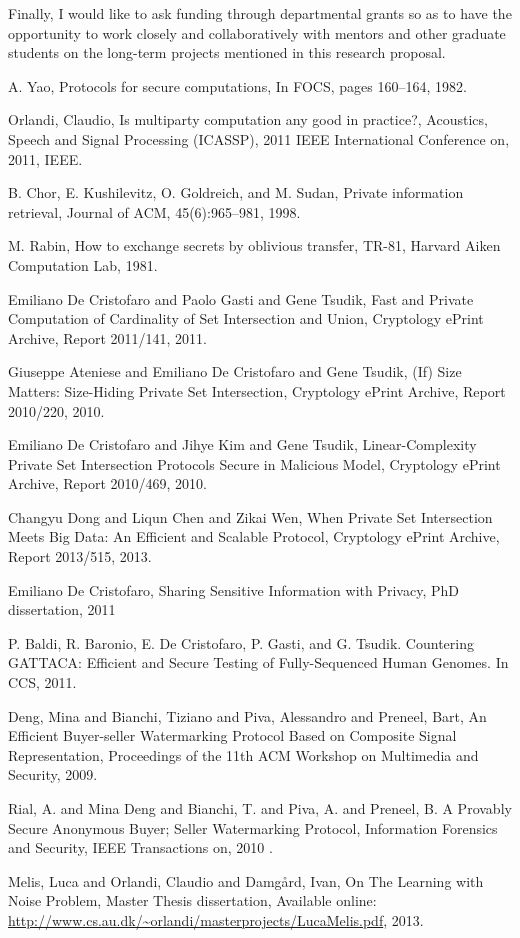 \documentclass[dvips,12pt]{article}
\begin{document}
Finally, I would like to ask funding through departmental grants so as to have the opportunity to work closely and collaboratively with mentors and other graduate students on the long-term projects mentioned in this research proposal.
\begin{thebibliography}{99}

	A. Yao,
	Protocols for secure computations,	
	In FOCS, pages 160–164, 1982.

	Orlandi, Claudio,  	
  	Is multiparty computation any good in practice?,
  	{Acoustics, Speech and Signal Processing (ICASSP), 2011 IEEE International Conference on},
  	2011,
  	IEEE.

	B. Chor, E. Kushilevitz, O. Goldreich, and M. Sudan,	
	Private information retrieval,
	Journal of ACM, 45(6):965–981, 
	1998.

	M. Rabin,
	How to exchange secrets by oblivious transfer,
	TR-81, Harvard Aiken Computation Lab, 
	1981.

	Emiliano De Cristofaro and Paolo Gasti and Gene Tsudik,	
	Fast and Private Computation of Cardinality of Set Intersection and Union, 
    Cryptology ePrint Archive, Report 2011/141,
    2011.
    
	Giuseppe Ateniese and Emiliano De Cristofaro and Gene Tsudik,
    (If) Size Matters: Size-Hiding Private Set Intersection,
    Cryptology ePrint Archive, Report 2010/220,
	2010.

	Emiliano De Cristofaro and Jihye Kim and Gene Tsudik,	
	Linear-Complexity Private Set Intersection Protocols Secure in Malicious Model,
	Cryptology ePrint Archive, Report 2010/469,
	2010.

	Changyu Dong and Liqun Chen and Zikai Wen,
	When Private Set Intersection Meets Big Data: An Efficient and Scalable Protocol,
	Cryptology ePrint Archive, Report 2013/515,
	2013.

	Emiliano De Cristofaro,
	Sharing Sensitive Information with Privacy,
	PhD dissertation,
	2011

	P. Baldi, R. Baronio, E. De Cristofaro, P. Gasti, and G. Tsudik. 
	Countering GATTACA: Efficient and Secure Testing of Fully-Sequenced Human Genomes.
	In CCS, 
	2011.
	
	Deng, Mina and Bianchi, Tiziano and Piva, Alessandro and Preneel, Bart,
	An Efficient Buyer-seller Watermarking Protocol Based on Composite Signal Representation,
	Proceedings of the 11th ACM Workshop on Multimedia and Security,
	2009.
	
	Rial, A. and Mina Deng and Bianchi, T. and Piva, A. and Preneel, B.
	A Provably Secure Anonymous Buyer; Seller Watermarking Protocol,
	Information Forensics and Security, IEEE Transactions on,
	2010	.	

	Melis, Luca and Orlandi, Claudio and Damg{\aa}rd, Ivan, 
	On The Learning with Noise Problem,
	Master Thesis dissertation,
	Available online: {\url{http://www.cs.au.dk/~orlandi/masterprojects/LucaMelis.pdf}},
	2013.
	

\end{thebibliography}
\end{document}

